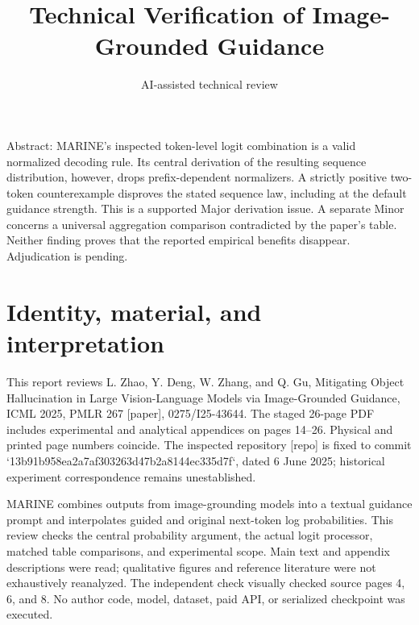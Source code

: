 \documentclass[10pt]{article}
\title{Technical Verification of Image-Grounded Guidance}
\author{AI-assisted technical review}
\date{}
\begin{document}
\maketitle
Abstract: MARINE’s inspected token-level logit combination is a valid normalized decoding rule. Its central derivation of the resulting sequence distribution, however, drops prefix-dependent normalizers. A strictly positive two-token counterexample disproves the stated sequence law, including at the default guidance strength. This is a supported Major derivation issue. A separate Minor concerns a universal aggregation comparison contradicted by the paper’s table. Neither finding proves that the reported empirical benefits disappear. Adjudication is pending.\par
\section*{Identity, material, and interpretation}
This report reviews L. Zhao, Y. Deng, W. Zhang, and Q. Gu, Mitigating Object Hallucination in Large Vision-Language Models via Image-Grounded Guidance, ICML 2025, PMLR 267 [paper], 0275/I25-43644. The staged 26-page PDF includes experimental and analytical appendices on pages 14–26. Physical and printed page numbers coincide. The inspected repository [repo] is fixed to commit `13b91b958ea2a7af303263d47b2a8144ec335d7f`, dated 6 June 2025; historical experiment correspondence remains unestablished.\par
MARINE combines outputs from image-grounding models into a textual guidance prompt and interpolates guided and original next-token log probabilities. This review checks the central probability argument, the actual logit processor, matched table comparisons, and experimental scope. Main text and appendix descriptions were read; qualitative figures and reference literature were not exhaustively reanalyzed. The independent check visually checked source pages 4, 6, and 8. No author code, model, dataset, paid API, or serialized checkpoint was executed.\par
\end{document}
